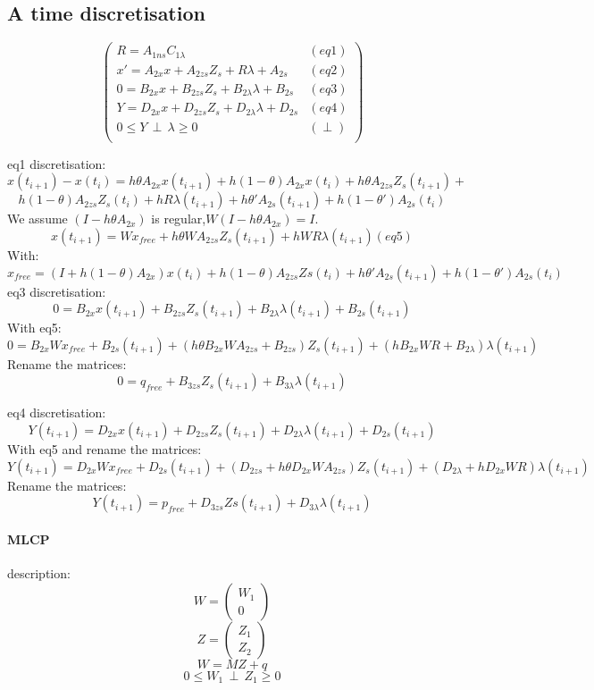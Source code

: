 \subsection{A time discretisation}
\[\left(\begin{array}{cc}
R=A_{1ns}C_{1\lambda}&(eq1)\\
x'=A_{2x}x +A_{2zs}Z_{s} +R \lambda +A_{2s}&(eq2)\\
0=B_{2x}x+B_{2zs}Z_{s} + B_{2\lambda}\lambda + B_{2s}&(eq3)\\
Y=D_{2x}x+D_{2zs}Z_{s}+D_{2\lambda}\lambda + D_{2s} &(eq4)\\
0 \leq Y \, \perp \, \lambda \geq 0&(\perp)\\
\end{array}\right)\]

 eq1 discretisation:
\[x(t_{i+1}) - x(t_{i})=h\theta A_{2x}x(t_{i+1})+h(1-\theta)A_{2x}x(t_{i}) +h\theta
A_{2zs}Z_{s}(t_{i+1}) +\]
\[h(1-\theta)A_{2zs}Z_s(t_{i}) +hR\lambda (t_{i+1}) + h\theta 'A_{2s}(t_{i+1}) +
h(1-\theta ')A_{2s}(t_{i})\]
We assume $(I-h\theta A_{2x})$ is regular,$W(I-h\theta A_{2x}) = I.$
\[x(t_{i+1})=Wx_{free}+h\theta WA_{2zs}Z_{s}(t_{i+1})+hWR\lambda (t_{i+1})  (eq5)\]
With:
\[x_{free}=(I+h(1-\theta)A_{2x})x(t_{i}) + h(1-\theta )A_{2zs}Zs(t_{i}) + h\theta 'A_{2s}(t_{i+1}) +
h(1-\theta ')A_{2s}(t_{i})\]
eq3 discretisation:
\[0 = B_{2x}x(t_{i+1})+B_{2zs}Z_{s}(t_{i+1}) + B_{2\lambda}\lambda(t_{i+1})+B_{2s}(t_{i+1})\]
With eq5:
\[0 = B_{2x}Wx_{free}+B_{2s}(t_{i+1})+(h\theta B_{2x} WA_{2zs}+B_{2zs}) Z_{s}(t_{i+1})+(hB_{2x}WR+B_{2\lambda})\lambda(t_{i+1})\]
Rename the matrices:
\[0 = q_{free}+B_{3zs} Z_{s}(t_{i+1})+B_{3\lambda}\lambda(t_{i+1})\]

eq4 discretisation:
\[Y(t_{i+1})=D_{2x}x(t_{i+1})+D_{2zs}Z_{s}(t_{i+1}) +D_{2\lambda}\lambda(t_{i+1})+D_{2s}(t_{i+1})\]
With eq5 and rename the matrices:
\[Y(t_{i+1})=D_{2x}Wx_{free}+ D_{2s}(t_{i+1})+(D_{2zs}+h\theta
D_{2x}WA_{2zs})Z_{s}(t_{i+1})+(D_{2\lambda} + hD_{2x}WR)\lambda(t_{i+1})\]
Rename the matrices:
\[Y(t_{i+1})=p_{free}+D_{3zs}Zs(t_{i+1}) +D_{3\lambda}\lambda (t_{i+1})\]

\paragraph{MLCP}
description:\\

\[W=\left(\begin{array}{c}W_{1}\\0\end{array}\right)\]
\[Z=\left(\begin{array}{c}Z_{1}\\Z_{2}\end{array}\right)\]
\[W=MZ+q\]
\[0 \leq W_{1} \, \perp \, Z_{1} \geq 0\]

